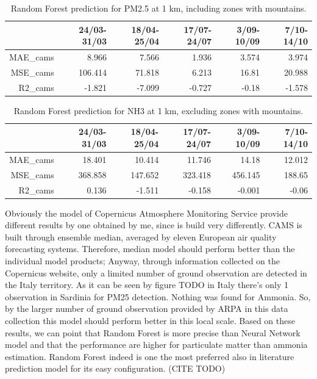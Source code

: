 \begin{table}[H]
\begin{tabular}{rrrrrr}
\hline
     &   24/03-31/03 &   18/04-25/04 &   17/07-24/07 &   3/09-10/09 &   7/10-14/10 \\
\hline
   MAE\_cams     &            8.966 &            7.566 &            1.936 &            3.574 &            3.974 \\
  MSE\_cams     &          106.414 &           71.818 &            6.213 &           16.81  &           20.988 \\
   R2\_cams      &           -1.821 &           -7.099 &           -0.727 &           -0.18  &           -1.578 \\
\hline
\end{tabular}
\caption{Random Forest prediction for PM2.5 at 1 km, including zones with mountains.}
\end{table}
\begin{table}[H]
\begin{tabular}{rrrrrr}
\hline
     &   24/03-31/03 &   18/04-25/04 &   17/07-24/07 &   3/09-10/09 &   7/10-14/10 \\
\hline
  MAE\_cams     &           18.401 &           10.414 &           11.746 &           14.18  &           12.012 \\
  MSE\_cams     &          368.858 &          147.652 &          323.418 &          456.145 &          188.65  \\
  R2\_cams      &            0.136 &           -1.511 &           -0.158 &           -0.001 &           -0.06  \\
\hline
\end{tabular}
\caption{Random Forest prediction for NH3 at 1 km, excluding zones with mountains.}
\end{table}
Obviously the model of Copernicus Atmosphere Monitoring Service provide different results by one obtained by me, since is build very differently. CAMS is built through ensemble median, averaged by eleven European air quality forecasting systems. Therefore, median model should perform better than the individual model products\cite{riccio2007seeking}; 
Anyway, through information collected on the Copernicus website, only a limited number of ground observation are detected in the Italy territory. As it can be seen by figure TODO in Italy there's only 1 observation in Sardinia for PM25 detection. Nothing was found for Ammonia.
So, by the larger number of ground observation provided by ARPA in this data collection this model should perform better in this local scale.
\bigbreak
Based on these results, we can point that Random Forest is more precise than Neural Network model and that the performance are higher for particulate matter than ammonia estimation.
Random Forest indeed is one the most preferred also in literature prediction model for its easy configuration. (CITE TODO)
